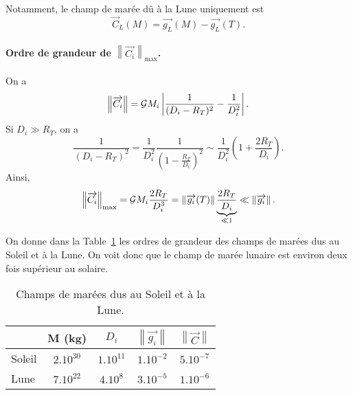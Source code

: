         Notamment, le champ de marée dû à la Lune uniquement est
        \begin{equation}
            \vec{C}_L(M)=\vec{g_L}(M)-\vec{g_L}(T).
        \end{equation}

        \paragraph{Ordre de grandeur de $\left\lVert\vec{C_i}\right\rVert_{\text{max}}$.} 
            On a 
            \begin{equation}
                \left\lVert \protect\overrightarrow{{C_i}}\right\rVert=\mathcal{G} M_i\left\lvert\frac{1}{(D_i-R_T)^{2}}-\frac{1}{D_i^{2}}\right\rvert.
            \end{equation}
            Si $D_i\gg R_T$, on a 
            \begin{equation}
                \frac{1}{(D_i-R_T)^{2}}=\frac{1}{D_i^{2}}\frac{1}{\left(1-\frac{R_T}{D_i}\right)^{2}}\sim\frac{1}{D_i^{2}}\left(1+\frac{2R_T}{D_i}\right).
            \end{equation}
            Ainsi,
            \begin{equation}
                \left\lVert \protect\overrightarrow{{C_i}}\right\rVert_{\text{max}}=\mathcal{G} M_i\frac{2R_T}{D_i^{3}}=\left\lVert\protect\overrightarrow{{g_i}}(T)\right\rVert\underbrace{\frac{2R_T}{D_i}}_{\ll1}\ll\left\lVert \protect\overrightarrow{{g_i}}\right\rVert.
            \end{equation}
            
            On donne dans la Table~\ref{tab:champ_maree_soleil_lune} les ordres de grandeur des champs de marées dus au Soleil et à la Lune. On voit donc que le champ de marée lunaire est environ deux fois supérieur au solaire.
            
            \begin{table}
                \centering
                \begin{tabular}{l|c|c|c|c}
                    \toprule
                    & M (kg) & $D_i$ & $\left\lVert \vec{g_i}\right\rVert$ & $\left\lVert\vec{C}\right\rVert$\\ \midrule
                    Soleil & $2.10^{30}$ & $1.10^{11}$ & $1.10^{-2}$ & $5.10^{-7}$\\ \midrule
                    Lune & $7.10^{22}$ & $4.10^{8}$ & $3.10^{-5}$ & $1.10^{-6}$\\ \bottomrule
                \end{tabular}    
                \caption{Champs de marées dus au Soleil et à la Lune.}
                \label{tab:champ_maree_soleil_lune}
            \end{table}
        
